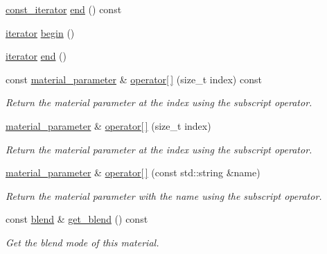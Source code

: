 \begin{DoxyCompactItemize}
\item 
\mbox{\hyperlink{classmoka_1_1material_ab87ba893c5a7741e95718b0bddbc1049}{const\+\_\+iterator}} \mbox{\hyperlink{classmoka_1_1material_aa8f02d714d51e11b0336f5a2080090b3}{end}} () const
\item 
\mbox{\hyperlink{classmoka_1_1material_ac6839c8e1a338dbaef539569388f89e5}{iterator}} \mbox{\hyperlink{classmoka_1_1material_a37b3e0f903ed7e55497d5797c52d7f36}{begin}} ()
\item 
\mbox{\hyperlink{classmoka_1_1material_ac6839c8e1a338dbaef539569388f89e5}{iterator}} \mbox{\hyperlink{classmoka_1_1material_a3538c3832514f230975113c02ef9b019}{end}} ()
\item 
const \mbox{\hyperlink{structmoka_1_1material__parameter}{material\+\_\+parameter}} \& \mbox{\hyperlink{classmoka_1_1material_acf1a2885fe704ce6684080c52f106f70}{operator\mbox{[}$\,$\mbox{]}}} (size\+\_\+t index) const
\begin{DoxyCompactList}\small\item\em Return the material parameter at the index using the subscript operator. \end{DoxyCompactList}\item 
\mbox{\hyperlink{structmoka_1_1material__parameter}{material\+\_\+parameter}} \& \mbox{\hyperlink{classmoka_1_1material_a9232eb8fae1ebace716db92e7bd118af}{operator\mbox{[}$\,$\mbox{]}}} (size\+\_\+t index)
\begin{DoxyCompactList}\small\item\em Return the material parameter at the index using the subscript operator. \end{DoxyCompactList}\item 
\mbox{\hyperlink{structmoka_1_1material__parameter}{material\+\_\+parameter}} \& \mbox{\hyperlink{classmoka_1_1material_ae29638762c567b2a27b750c40226a0a5}{operator\mbox{[}$\,$\mbox{]}}} (const std\+::string \&name)
\begin{DoxyCompactList}\small\item\em Return the material parameter with the name using the subscript operator. \end{DoxyCompactList}\item 
const \mbox{\hyperlink{structmoka_1_1blend}{blend}} \& \mbox{\hyperlink{classmoka_1_1material_a1d3a936d00273cb2c6692c1c5df03351}{get\+\_\+blend}} () const
\begin{DoxyCompactList}\small\item\em Get the blend mode of this material. \end{DoxyCompactList}\item 

\end{DoxyCompactItemize}

